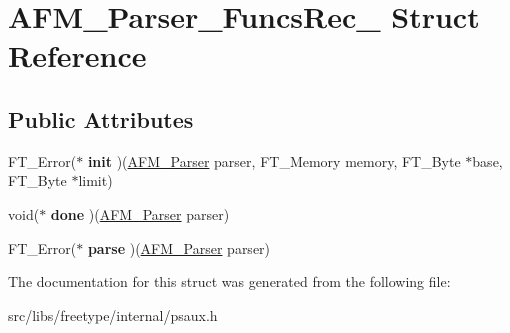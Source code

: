 \hypertarget{struct_a_f_m___parser___funcs_rec__}{
\section{AFM\_\-Parser\_\-FuncsRec\_\- Struct Reference}
\label{struct_a_f_m___parser___funcs_rec__}
}
\subsection*{Public Attributes}
\begin{DoxyCompactItemize}
\item 
\hypertarget{struct_a_f_m___parser___funcs_rec___a7d5c1422c71ef00984f1207ebfb0b082}{
FT\_\-Error($\ast$ {\bfseries init} )(\hyperlink{struct_a_f_m___parser_rec__}{AFM\_\-Parser} parser, FT\_\-Memory memory, FT\_\-Byte $\ast$base, FT\_\-Byte $\ast$limit)}
\label{struct_a_f_m___parser___funcs_rec___a7d5c1422c71ef00984f1207ebfb0b082}

\item 
\hypertarget{struct_a_f_m___parser___funcs_rec___af4e8bc33b14d14b47d13caf0a2449d1b}{
void($\ast$ {\bfseries done} )(\hyperlink{struct_a_f_m___parser_rec__}{AFM\_\-Parser} parser)}
\label{struct_a_f_m___parser___funcs_rec___af4e8bc33b14d14b47d13caf0a2449d1b}

\item 
\hypertarget{struct_a_f_m___parser___funcs_rec___a2cd41be89cf12f9227c6f18220cbe2f3}{
FT\_\-Error($\ast$ {\bfseries parse} )(\hyperlink{struct_a_f_m___parser_rec__}{AFM\_\-Parser} parser)}
\label{struct_a_f_m___parser___funcs_rec___a2cd41be89cf12f9227c6f18220cbe2f3}

\end{DoxyCompactItemize}


The documentation for this struct was generated from the following file:\begin{DoxyCompactItemize}
\item 
src/libs/freetype/internal/psaux.h\end{DoxyCompactItemize}
